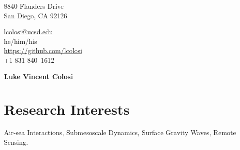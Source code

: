 \documentclass[10pt]{article}
\begin{document}
\pagestyle{empty}
\begin{minipage}[ht]{0.48\textwidth}
\begin{flushleft}
\small{8840 Flanders Drive} \\
\small{San Diego, CA 92126} \\
\end{flushleft}
\end{minipage}
\hfill
\begin{minipage}[ht]{0.48\textwidth}
\begin{flushright}
\noindent \href{mailto:lcolosi@ucsd.edu}{lcolosi@ucsd.edu} \ \ \ \ \ \ \ \ \ \ \ \ \ \ \ \ \ \ \ \   \\
\noindent he/him/his \ \ \ \ \ \ \ \ \ \ \ \ \ \ \ \ \ \ \ \ \ \ \ \ \ \ \  \\
{\url{https://github.com/lcolosi} }\\
\small{+1 831 840--1612} \ \ \ \ \ \ \ \ \ \ \ \ \ \ \ \ \  \ \ \ \ \ \ \     \\
\end{flushright}
\end{minipage}


\vspace{.5cm}
\begin{center}
	{\bfseries\Huge Luke Vincent Colosi}
\end{center}
\vspace{.5cm}

\section*{Research Interests}
\vspace{.3cm}
\hspace{1cm}Air-sea Interactions, Submesoscale Dynamics, Surface Gravity Waves, Remote Sensing.

\end{document}
